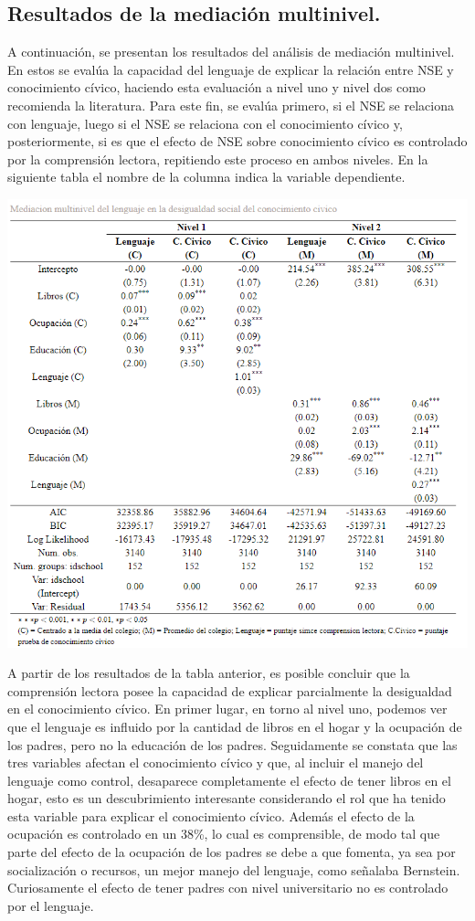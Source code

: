\documentclass[12pt,twoside]{templates/facsothesis}
\begin{document}
\hypertarget{resultados-de-la-mediaciuxf3n-multinivel.}{%
\subsection{Resultados de la mediación multinivel.}\label{resultados-de-la-mediaciuxf3n-multinivel.}}

A continuación, se presentan los resultados del análisis de mediación multinivel. En estos se evalúa la capacidad del lenguaje de explicar la relación entre NSE y conocimiento cívico, haciendo esta evaluación a nivel uno y nivel dos como recomienda la literatura. Para este fin, se evalúa primero, si el NSE se relaciona con lenguaje, luego si el NSE se relaciona con el conocimiento cívico y, posteriormente, si es que el efecto de NSE sobre conocimiento cívico es controlado por la comprensión lectora, repitiendo este proceso en ambos niveles. En la siguiente tabla el nombre de la columna indica la variable dependiente.

\begin{center}\includegraphics[width=0.8\linewidth]{images/Mediacion_n1n2} \end{center}

A partir de los resultados de la tabla anterior, es posible concluir que la comprensión lectora posee la capacidad de explicar parcialmente la desigualdad en el conocimiento cívico. En primer lugar, en torno al nivel uno, podemos ver que el lenguaje es influido por la cantidad de libros en el hogar y la ocupación de los padres, pero no la educación de los padres. Seguidamente se constata que las tres variables afectan el conocimiento cívico y que, al incluir el manejo del lenguaje como control, desaparece completamente el efecto de tener libros en el hogar, esto es un descubrimiento interesante considerando el rol que ha tenido esta variable para explicar el conocimiento cívico. Además el efecto de la ocupación es controlado en un 38\%, lo cual es comprensible, de modo tal que parte del efecto de la ocupación de los padres se debe a que fomenta, ya sea por socialización o recursos, un mejor manejo del lenguaje, como señalaba Bernstein. Curiosamente el efecto de tener padres con nivel universitario no es controlado por el lenguaje.
\end{document}
